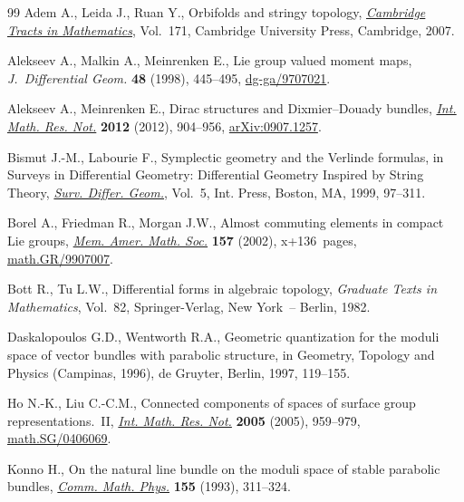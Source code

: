 \documentclass[11pt]{article}
\numberwithin{equation}{section}
\begin{document}
\begin{thebibliography}{99}
Adem A., Leida J., Ruan Y., Orbifolds and stringy topology, \href{http://dx.doi.org/10.1017/CBO9780511543081}{\textit{Cambridge
  Tracts in Mathematics}}, Vol.~171, Cambridge University Press, Cambridge,
  2007.

Alekseev A., Malkin A., Meinrenken E., Lie group valued moment maps,
  \textit{J.~Differential Geom.} \textbf{48} (1998), 445--495,
  \href{http://arxiv.org/abs/dg-ga/9707021}{dg-ga/9707021}.

Alekseev A., Meinrenken E., Dirac structures and {D}ixmier--{D}ouady bundles,
  \href{http://dx.doi.org/10.1093/imrn/rnr002}{\textit{Int. Math. Res. Not.}} \textbf{2012} (2012), 904--956,
  \href{http://arxiv.org/abs/0907.1257}{arXiv:0907.1257}.

Bismut J.-M., Labourie F., Symplectic geometry and the {V}erlinde formulas, in
  Surveys in Dif\/ferential Geometry: Dif\/ferential Geometry Inspired by String
  Theory, \href{http://dx.doi.org/10.4310/SDG.1999.v5.n1.a2}{\textit{Surv. Differ. Geom.}}, Vol.~5, Int. Press, Boston, MA, 1999,
  97--311.

Borel A., Friedman R., Morgan J.W., Almost commuting elements in compact {L}ie
  groups, \href{http://dx.doi.org/10.1090/memo/0747}{\textit{Mem. Amer. Math. Soc.}} \textbf{157} (2002), x+136~pages,
  \href{http://arxiv.org/abs/math.GR/9907007}{math.GR/9907007}.

Bott R., Tu L.W., Dif\/ferential forms in algebraic topology, \textit{Graduate
  Texts in Mathematics}, Vol.~82, Springer-Verlag, New York~-- Berlin, 1982.

Daskalopoulos G.D., Wentworth R.A., Geometric quantization for the moduli space
  of vector bundles with parabolic structure, in Geometry, Topology and Physics
  ({C}ampinas, 1996), de Gruyter, Berlin, 1997, 119--155.

Ho N.-K., Liu C.-C.M., Connected components of spaces of surface group
  representations.~{II}, \href{http://dx.doi.org/10.1155/IMRN.2005.959}{\textit{Int. Math. Res. Not.}} \textbf{2005} (2005),
  959--979, \href{http://arxiv.org/abs/math.SG/0406069}{math.SG/0406069}.

Konno H., On the natural line bundle on the moduli space of stable parabolic
  bundles, \href{http://dx.doi.org/10.1007/BF02097396}{\textit{Comm. Math. Phys.}} \textbf{155} (1993), 311--324.


\end{thebibliography}
\end{document}
